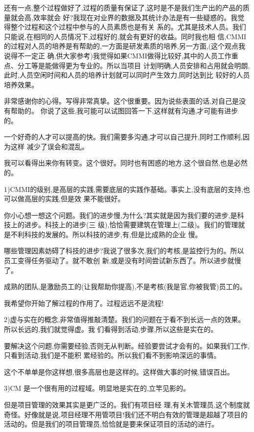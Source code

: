 \documentclass[11pt]{article}
\begin{document}
\begin{staff}
  还有一点,整个过程做好了,过程的质量有保证了,这时是不是我们生产出的产品的质量就会高,效率就会
  好?我现在对业界的数据及其统计办法是有一些疑惑的。我觉得整个过程和这个过程中参与的人员素质也是有关
  系的。尤其是技术人员。我们只能说,在相同的人员情况下,过程好的,就会有更好的收益。同时我也相
  信,CMMI的过程对人员的培养是有帮助的,一方面是研发素质的培养,另一方面,(这个观点我说得不一定正
  确,供大家参考)我觉得如果CMMI做得比较好,其中的人员工作重点、分工等是能做得更为专业的。所以当项目
  计划明确,人员安排和占用就会明朗,此时,人员空闲时间和人员的培养计划就可以同时产生效力,同时达到比
  较好的人员培养效果。
\end{staff}

\begin{yang}
\ylogo 非常感谢你的心得。写得非常真挚。这个很重要。因为说些表面的话,对自己是没有帮助的。
你说了这些,我可能可以试图回答一下,这样就有沟通,才可能有进步的。

一个好奇的人才可以提高的快。我们需要多沟通,才可以自己提升,同时工作顺利,因为这样
减少了误会和混乱。

我可以看得出来你有转变。这个很好。同时也有困惑的地方,这个很自然,也是必然的。

1)CMMI的级别,是高层的实践,需要底层的实践作基础。事实上,没有底层的支持,也可以做高层的实践,但是效
果不能很好。

你小心想一想这个问题。我们的进步慢,为什么?其实就是因为我们要的进步,是科技上的进步。科技上的进步(三
级),恰恰需要建筑在管理上(二级)。我们的管理就是不利科技的发展的。所以科技的进步,有,但是比成熟的企业
慢。

哪些管理因素妨碍了科技的进步?我说了很多次,我们的考核,是监控行为的。所以员工变得任务驱动了。就不敢创
新,或是没有时间尝试新东西了。所以进步就慢了。

成熟的团队,是激励员工的(让我帮助你提高),不是考核(我是官,你被我管)员工的。

我希望你开始了解过程的作用了。过程远远不是流程!

2)虚与实在的概念,非常值得推敲清楚。我们的问题在于看不到长远一点的效果。所以长远的,我们就觉得虚。我
们看得到活动,步骤,所以这些是实在的。

要解决这个问题,你需要经验,否则无从判断。经验要尝试才会有的。如果我们工作,只看到活动,我们是不能积
累经验的。所以我们看不到影响深远的事情。

这个不单单是你这样想,很多高层也是这样的。这样做大事的时候,错误百出。

3)CM 是一个很有用的过程域。明显地是实在的,立竿见影的。

但是项目管理的效果其实是更广泛的。我们有项目经
理,有关木管理员,这个制度就奇怪。好像就是说,项目经理不用管项目!我们还不明白有效的管理是超越了项目的
活动的。但是我们的项目管理员,恰恰就是要来保证项目的活动的进行。


\end{yang}
\end{document}
